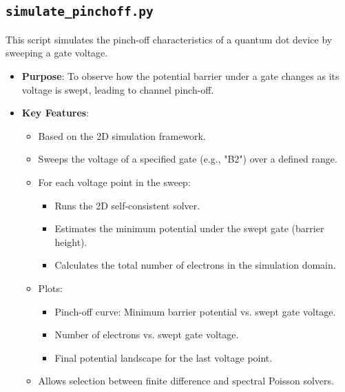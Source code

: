 \documentclass{article}
\begin{document}
\subsection{\texttt{simulate\_pinchoff.py}}
This script simulates the pinch-off characteristics of a quantum dot device by sweeping a gate voltage.
\begin{itemize}
    \item \textbf{Purpose}: To observe how the potential barrier under a gate changes as its voltage is swept, leading to channel pinch-off.
    \item \textbf{Key Features}:
        \begin{itemize}
            \item Based on the 2D simulation framework.
            \item Sweeps the voltage of a specified gate (e.g., "B2") over a defined range.
            \item For each voltage point in the sweep:
                \begin{itemize}
                    \item Runs the 2D self-consistent solver.
                    \item Estimates the minimum potential under the swept gate (barrier height).
                    \item Calculates the total number of electrons in the simulation domain.
                \end{itemize}
            \item Plots:
                \begin{itemize}
                    \item Pinch-off curve: Minimum barrier potential vs. swept gate voltage.
                    \item Number of electrons vs. swept gate voltage.
                    \item Final potential landscape for the last voltage point.
                \end{itemize}
            \item Allows selection between finite difference and spectral Poisson solvers.
        \end{itemize}
\end{itemize}
\end{document}
